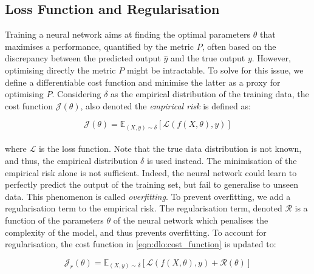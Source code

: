 

\subsection{Loss Function and Regularisation}
Training a neural network aims at finding the optimal parameters $\theta$ that
maximises a performance, quantified by the metric $P$, often based on the
discrepancy between the predicted output $\hat{y}$ and the true output $y$.
However, optimising directly the metric $P$ might be intractable. To solve for
this issue, we define a differentiable cost function and minimise the latter as
a proxy for optimising $P$. Considering $\delta$ as the empirical distribution
of the training data, the cost function $\mathcal{J}(\theta)$, also denoted the
\emph{empirical risk} is defined as:

\begin{equation}
  \label{eqn:dlo:cost_function}
  \mathcal{J}(\theta) = \mathds{E}_{(X, y) \sim \delta} \left[ \mathcal{L}(f(X,\theta), y) \right]
\end{equation}\\

\noindent where $\mathcal{L}$ is the loss function. Note that the true data
distribution is not known, and thus, the empirical distribution $\delta$ is used
instead. The minimisation of the empirical risk alone is not sufficient. Indeed,
the neural network could learn to perfectly predict the output of the training
set, but fail to generalise to unseen data. This phenomenon is called
\emph{overfitting}. To prevent overfitting, we add a regularisation term to the
empirical risk. The regularisation term, denoted $\mathcal{R}$ is a function of
the parameters $\theta$ of the neural network which penalises the complexity of
the model, and thus prevents overfitting. To account for regularisation, the
cost function in \cref{eqn:dlo:cost_function} is updated to:

\begin{equation}
  \label{eqn:dlo:regularised_cost_fn}
  \mathcal{J}_r(\theta) = \mathds{E}_{(X, y) \sim \delta} \left[ \mathcal{L}(f(X,\theta), y) + \mathcal{R}(\theta) \right]
\end{equation}\\

